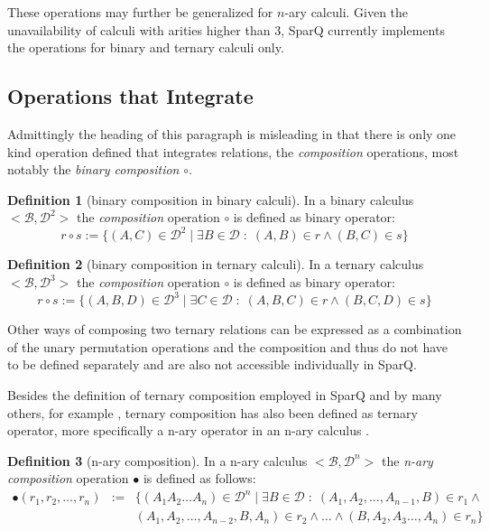 \documentclass[headsepline]{scrreprt}
\theoremstyle{definition}
\newtheorem{defn}{Definition}
\newcommand{\engine}{SparQ}
\begin{document}
These operations may further be generalized for $n$-ary calculi.
Given the unavailability of calculi with arities higher than 3, SparQ currently implements the operations for binary and ternary calculi only.

\subsection{Operations that Integrate}
Admittingly the heading of this paragraph is misleading in that there is only one kind operation defined that integrates relations, the {\em composition} operations, most notably the {\em binary composition} $\circ$.

\begin{defn}[binary composition in binary calculi] In a binary calculus $<\mathcal{B},\mathcal{D}^2>$ the {\em composition} operation $\circ$ is defined as binary operator:
	$$ r \circ s := \{ (A,C) \in \mathcal{D}^2\; |\; \exists B \in \mathcal{D}\; :\; (A,B) \in r \wedge (B,C) \in s\}$$
\end{defn}

\begin{defn}[binary composition in ternary calculi] In a ternary calculus $<\mathcal{B},\mathcal{D}^3>$ the {\em composition} operation $\circ$ is defined as binary operator:
	$$ r \circ s := \{ (A,B,D) \in \mathcal{D}^3\; |\; \exists C \in \mathcal{D}\; :\; (A,B,C) \in r \wedge (B,C,D) \in s\}$$
\end{defn}

Other ways of composing two ternary relations can be expressed as
a combination of the unary permutation operations and the composition
\citep{scivos01} and thus do not have to be defined separately and are
also not accessible individually in \engine{}.

Besides the definition of ternary composition employed in \engine{} and by many others, for example \cite{cosyfre92}, ternary composition has also been defined as ternary operator, more specifically a n-ary operator in an n-ary calculus \cite{Condotta_Ligozat_Saade_06_A}.

\begin{defn}[n-ary composition] In a n-ary calculus $<\mathcal{B},\mathcal{D}^n>$ the {\em n-ary composition} operation $\bullet$ is defined as follows:
\begin{eqnarray*}
	 \bullet (r_1, r_2, \ldots, r_n) &:=& \{ (A_1 A_2 \ldots A_n) \in \mathcal{D}^n\; |\; \exists B \in \mathcal{D}\; :\; (A_1, A_2, \ldots, A_{n-1}, B) \in r_1 \wedge \\ 
	  & & (A_1, A_2, \ldots, A_{n-2}, B, A_n) \in r_2 \wedge \ldots \wedge (B,  A_2, A_3 \ldots, A_n) \in r_n\}
\end{eqnarray*}
\end{defn}
\end{document}

